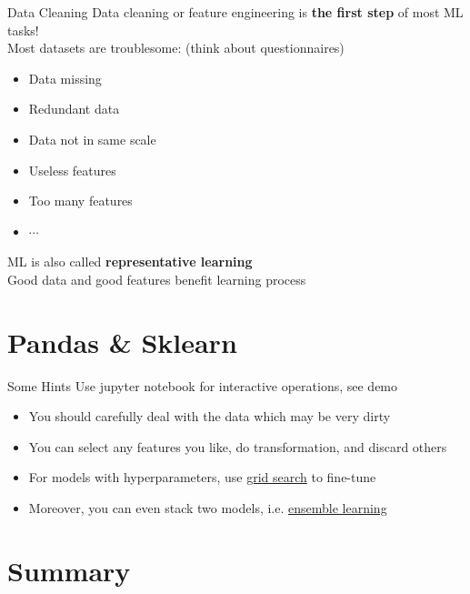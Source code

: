 \documentclass{../TexTemplate/myslide}
\begin{document}
\begin{frame}{Data Cleaning}
Data cleaning or feature engineering is \textbf{the first step} of most ML tasks!\\
Most datasets are troublesome: (think about questionnaires)
\begin{itemize}
	\item Data missing
	\item Redundant data
	\item Data not in same scale
	\item Useless features
	\item Too many features
	\item $\cdots$
\end{itemize}
ML is also called \textbf{representative learning}\\
Good data and good features benefit learning process
\end{frame}

\section{Pandas \& Sklearn}
\begin{frame}
\sectionpage
\end{frame}

\begin{frame}{Some Hints}
\hypertarget{hint}{}
Use jupyter notebook for interactive operations, see demo
\begin{itemize}
	\item You should carefully deal with the data which may be very dirty
	\item You can select any features you like, do transformation, and discard others
	\item For models with hyperparameters, use \href{https://scikit-learn.org/stable/modules/grid_search.html}{grid search} to fine-tune
	\item Moreover, you can even stack two models, i.e. \href{https://en.wikipedia.org/wiki/Ensemble_learning}{ensemble learning}
\end{itemize}
\end{frame}

\section{Summary}
\begin{frame}
\sectionpage
\end{frame}
\end{document}
